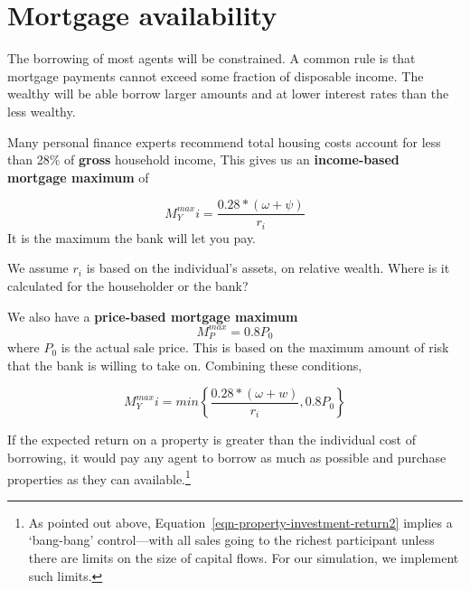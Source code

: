 {\color{SeaGreen}

\section{Mortgage availability} \label{section-mortgage-availability}

The borrowing of most agents will be constrained. A common rule is that mortgage payments cannot exceed some fraction of disposable income. The wealthy will be able borrow larger amounts and at lower interest rates than the less wealthy.

Many personal finance experts recommend total housing costs account for less than 28\% of \textbf{gross} household income, This gives us an \textbf{income-based  mortgage maximum} of 

\[M^{max}_Yi = \frac{0.28*(\omega+ \psi)}{r_i}\] It is the maximum the bank will let you pay.

We assume $r_i$ is based on the individual's assets, on relative wealth. Where is it calculated for the householder or the bank?

We also have  a \textbf{price-based mortgage maximum} \[M^{max}_P = 0.8P_0\] where $P_0$ is the actual sale price. This is based on the maximum amount of risk that the bank is willing to take on. Combining these conditions, %

\[M^{max}_Yi = min\left\{\frac{0.28*(\omega+w)}{r_i},  0.8P_0 \right\} \]



If the expected return on a property is greater than the individual cost of borrowing, it would pay any agent to borrow as much as possible and purchase properties as they can available.\footnote{As pointed out above,  Equation~\ref{eqn-property-investment-return2} implies a `bang-bang' control---with all sales going to the richest participant unless there are limits on the size of capital flows. For our simulation, we implement such limits.} 
 

}
